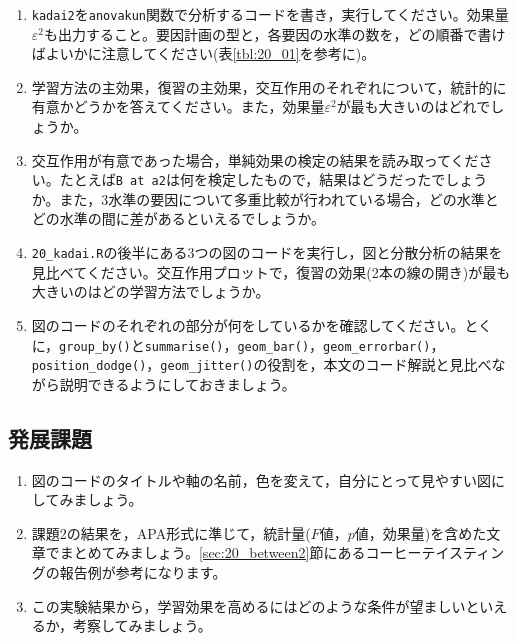 \documentclass{ltjbook}
\begin{document}
\begin{enumerate}
	\item \texttt{kadai2}を\verb|anovakun|関数で分析するコードを書き，実行してください。効果量$\varepsilon^2$も出力すること。要因計画の型と，各要因の水準の数を，どの順番で書けばよいかに注意してください(表\ref{tbl:20_01}を参考に)。
	\item 学習方法の主効果，復習の主効果，交互作用のそれぞれについて，統計的に有意かどうかを答えてください。また，効果量$\varepsilon^2$が最も大きいのはどれでしょうか。
	\item 交互作用が有意であった場合，単純効果の検定の結果を読み取ってください。たとえば\verb|B at a2|は何を検定したもので，結果はどうだったでしょうか。また，3水準の要因について多重比較が行われている場合，どの水準とどの水準の間に差があるといえるでしょうか。
	\item \texttt{20\_kadai.R}の後半にある3つの図のコードを実行し，図と分散分析の結果を見比べてください。交互作用プロットで，復習の効果(2本の線の開き)が最も大きいのはどの学習方法でしょうか。
	\item 図のコードのそれぞれの部分が何をしているかを確認してください。とくに，\verb|group_by()|と\verb|summarise()|，\verb|geom_bar()|，\verb|geom_errorbar()|，\verb|position_dodge()|，\verb|geom_jitter()|の役割を，本文のコード解説と見比べながら説明できるようにしておきましょう。
\end{enumerate}

\subsection{発展課題}
\begin{enumerate}
	\item 図のコードのタイトルや軸の名前，色を変えて，自分にとって見やすい図にしてみましょう。
	\item 課題2の結果を，APA形式に準じて，統計量($F$値，$p$値，効果量)を含めた文章でまとめてみましょう。\ref{sec:20_between2}節にあるコーヒーテイスティングの報告例が参考になります。
	\item この実験結果から，学習効果を高めるにはどのような条件が望ましいといえるか，考察してみましょう。
\end{enumerate}
\end{document}
